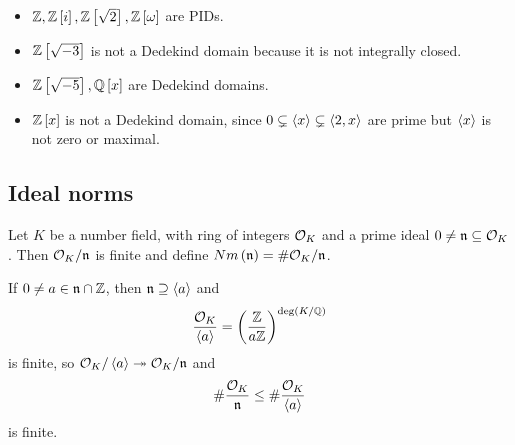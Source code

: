 \begin{example*}
\hfill
\begin{itemize}
\item $ \Z, \Z\sb{i}, \Z\sb{\sqrt{2}}, \Z\sb{\omega} $ are PIDs.
\item $ \Z\sb{\sqrt{-3}} $ is not a Dedekind domain because it is not integrally closed.
\item $ \Z\sb{\sqrt{-5}}, \Q\sb{x} $ are Dedekind domains.
\item $ \Z\sb{x} $ is not a Dedekind domain, since $ 0 \subsetneq \ab{x} \subsetneq \ab{2, x} $ are prime but $ \ab{x} $ is not zero or maximal.
\end{itemize}
\end{example*}

\subsection{Ideal norms}

\begin{definition}
Let $ K $ be a number field, with ring of integers $ \OO_K $ and a prime ideal $ 0 \ne \nn \subseteq \OO_K $. Then $ \OO_K / \nn $ is finite and define $ Nm\rb{\nn} = \#\OO_K / \nn $.
\end{definition}

If $ 0 \ne a \in \nn \cap \Z $, then $ \nn \supseteq \ab{a} $ and
$$ \dfrac{\OO_K}{\ab{a}} = \rb{\dfrac{\Z}{a\Z}}^{\deg\rb{K / \Q}} $$
is finite, so $ \OO_K / \ab{a} \twoheadrightarrow \OO_K / \nn $ and
$$ \#\dfrac{\OO_K}{\nn} \le \#\dfrac{\OO_K}{\ab{a}} $$
is finite.

